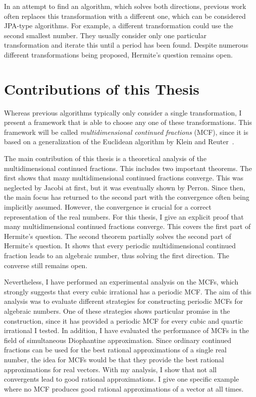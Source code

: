 In an attempt to find an algorithm, which solves both directions,
previous work often replaces this transformation with a different one,
which can be considered JPA-type algorithms.
For example, a different transformation could use the second smallest number.
They usually consider only one particular transformation and iterate this until a period has been found.
Despite numerous different transformations being proposed,
Hermite's question remains open.

\section{Contributions of this Thesis}
\label{sec:contributions}

Whereas previous algorithms typically only consider a single transformation,
I present a framework that is able to choose any one of these transformations.
This framework will be called \emph{multidimensional continued fractions} (MCF),
since it is based on a generalization of the Euclidean algorithm by Klein and
Reuter~\cite{Klein24}.

The main contribution of this thesis is a theoretical analysis of the
multidimensional continued fractions.
This includes two important theorems.
The first shows that many multidimensional continued fractions converge.
This was neglected by Jacobi at first, but it was eventually shown by Perron.
Since then, the main focus has returned to the second part
with the convergence often being implicitly assumed.
However, the convergence is crucial for a correct representation of the real numbers.
For this thesis, I give an explicit proof that many multidimensional continued
fractions converge.
This covers the first part of Hermite's question.
The second theorem partially solves the second part of Hermite's question.
It shows that every periodic multidimensional continued fraction leads to an
algebraic number, thus solving the first direction.
The converse still remains open.

Nevertheless, I have performed an experimental analysis on the MCFs,
which strongly suggests that every cubic irrational has a periodic MCF.
The aim of this analysis was to evaluate different strategies
for constructing periodic MCFs for algebraic numbers.
One of these strategies shows particular promise in the construction,
since it has provided a periodic MCF for every cubic and quartic irrational I tested.
In addition, I have evaluated the performance of MCFs in the field of
simultaneous Diophantine approximation.
Since ordinary continued fractions can be used for the best rational approximations
of a single real number, the idea for MCFs would be that they provide the best
rational approximations for real vectors.
With my analysis, I show that not all convergents lead to good rational approximations.
I give one specific example where no MCF produces good rational
approximations of a vector at all times.


